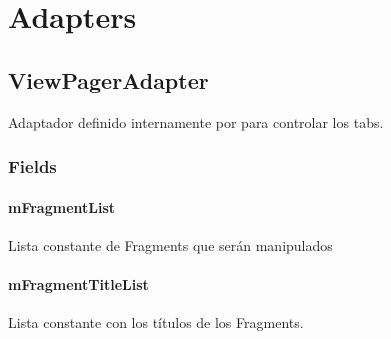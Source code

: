 \documentclass[letterpaper,10pt,english]{sphinxmanual}
\begin{document}
\chapter{Adapters}
\label{Adapter/package-index:adapters}\label{Adapter/package-index::doc}

\section{ViewPagerAdapter}
\label{Adapter/ViewPagerAdapter::doc}\label{Adapter/ViewPagerAdapter:viewpageradapter}

\begin{fulllineitems}
\label{Adapter/ViewPagerAdapter:com.fiuba.tallerii.jobify.ViewPagerAdapter}
Adaptador definido internamente por  para controlar los tabs.

\end{fulllineitems}



\subsection{Fields}
\label{Adapter/ViewPagerAdapter:fields}

\subsubsection{mFragmentList}
\label{Adapter/ViewPagerAdapter:mfragmentlist}

\begin{fulllineitems}
\label{Adapter/ViewPagerAdapter:com.fiuba.tallerii.jobify.ViewPagerAdapter.mFragmentList}
Lista constante de Fragments que serán manipulados

\end{fulllineitems}



\subsubsection{mFragmentTitleList}
\label{Adapter/ViewPagerAdapter:mfragmenttitlelist}

\begin{fulllineitems}
\label{Adapter/ViewPagerAdapter:com.fiuba.tallerii.jobify.ViewPagerAdapter.mFragmentTitleList}
Lista constante con los títulos de los Fragments.

\end{fulllineitems}
\end{document}
